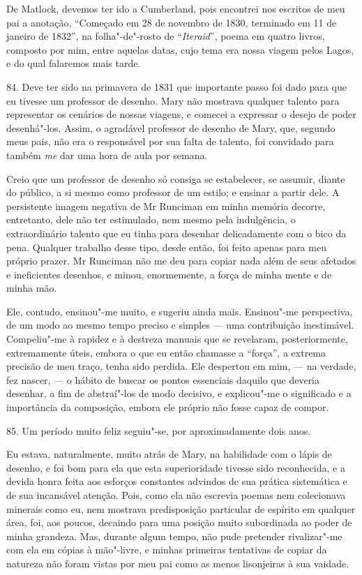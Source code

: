 De Matlock, devemos ter ido a Cumberland, pois encontrei nos escritos de
meu pai a anotação, ``Começado em 28 de novembro de 1830, terminado em
11 de janeiro de 1832'', na folha"-de"-rosto de ``\emph{Iteraid}'', poema
em quatro livros, composto por mim, entre aquelas datas, cujo tema era
nossa viagem pelos Lagos, e do qual falaremos mais tarde.

84. Deve ter sido na primavera de 1831 que importante passo foi dado
para que eu tivesse um professor de desenho. Mary não mostrava qualquer
talento para representar os cenários de nossas viagens, e comecei a
expressar o desejo de poder desenhá"-los. Assim, o agradável professor de
desenho de Mary, que, segundo meus pais, não era o responsável por sua
falta de talento, foi convidado para também \emph{me} dar uma hora de
aula por semana.

Creio que um professor de desenho só consiga se estabelecer, se assumir,
diante do público, a si mesmo como professor de um estilo; e ensinar a
partir dele. A persistente imagem negativa de Mr Runciman em minha
memória decorre, entretanto, dele não ter estimulado, nem mesmo pela
indulgência, o extraordinário talento que eu tinha para desenhar
delicadamente com o bico da pena. Qualquer trabalho desse tipo, desde
então, foi feito apenas para meu próprio prazer. Mr Runciman não me deu
para copiar nada além de seus afetados e ineficientes desenhos, e minou,
enormemente, a força de minha mente e de minha mão.

Ele, contudo, ensinou"-me muito, e sugeriu ainda mais. Ensinou"-me
perspectiva, de um modo ao mesmo tempo preciso e simples --- uma
contribuição inestimável. Compeliu"-me à rapidez e à destreza manuais que
se revelaram, posteriormente, extremamente úteis, embora o que eu então
chamasse a ``força'', a extrema precisão de meu traço, tenha sido
perdida. Ele despertou em mim, --- na verdade, fez nascer, --- o hábito de
buscar os pontos essenciais daquilo que deveria desenhar, a fim de
abstraí"-los de modo decisivo, e explicou"-me o significado e a
importância da composição, embora ele próprio não fosse capaz de compor.

85. Um período muito feliz seguiu"-se, por aproximadamente dois anos.

Eu estava, naturalmente, muito atrás de Mary, na habilidade com o lápis
de desenho, e foi bom para ela que esta superioridade tivesse sido
reconhecida, e a devida honra feita aos esforços constantes advindos de
sua prática sistemática e de sua incansável atenção. Pois, como ela não
escrevia poemas nem colecionava minerais como eu, nem mostrava
predisposição particular de espírito em qualquer área, foi, aos poucos,
decaindo para uma posição muito subordinada ao poder de minha grandeza.
Mas, durante algum tempo, não pude pretender rivalizar"-me com ela em
cópias à mão"-livre, e minhas primeiras tentativas de copiar da natureza
não foram vistas por meu pai como as menos lisonjeiras à sua vaidade.

